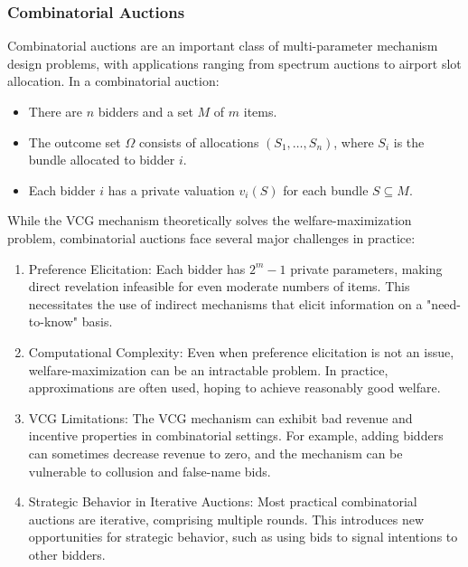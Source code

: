 \documentclass[
  letterpaper,
  DIV=11,
  numbers=noendperiod,
  oneside]{scrreprt}
\theoremstyle{remark}
\begin{document}
\subsubsection*{Combinatorial Auctions}\label{combinatorial-auctions}

Combinatorial auctions are an important class of multi-parameter
mechanism design problems, with applications ranging from spectrum
auctions to airport slot allocation. In a combinatorial auction:

\begin{itemize}
\item
  There are \(n\) bidders and a set \(M\) of \(m\) items.
\item
  The outcome set \(\Omega\) consists of allocations
  \((S_1, \ldots, S_n)\), where \(S_i\) is the bundle allocated to
  bidder \(i\).
\item
  Each bidder \(i\) has a private valuation \(v_i(S)\) for each bundle
  \(S \subseteq M\).
\end{itemize}

While the VCG mechanism theoretically solves the welfare-maximization
problem, combinatorial auctions face several major challenges in
practice:

\begin{enumerate}
\def\labelenumi{\arabic{enumi}.}
\item
  Preference Elicitation: Each bidder has \(2^m - 1\) private
  parameters, making direct revelation infeasible for even moderate
  numbers of items. This necessitates the use of indirect mechanisms
  that elicit information on a "need-to-know" basis.
\item
  Computational Complexity: Even when preference elicitation is not an
  issue, welfare-maximization can be an intractable problem. In
  practice, approximations are often used, hoping to achieve reasonably
  good welfare.
\item
  VCG Limitations: The VCG mechanism can exhibit bad revenue and
  incentive properties in combinatorial settings. For example, adding
  bidders can sometimes decrease revenue to zero, and the mechanism can
  be vulnerable to collusion and false-name bids.
\item
  Strategic Behavior in Iterative Auctions: Most practical combinatorial
  auctions are iterative, comprising multiple rounds. This introduces
  new opportunities for strategic behavior, such as using bids to signal
  intentions to other bidders.
\end{enumerate}
\end{document}
